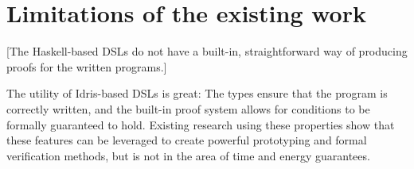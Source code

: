\section{Limitations of the existing work}
	[The Haskell-based DSLs do not have a built-in, straightforward way of producing proofs for the written programs.]
	
	The utility of Idris-based DSLs is great: The types ensure that the program is correctly written, and the built-in proof system allows for conditions to be formally guaranteed to hold. Existing research using these properties \cite{5158855,brady2010correct,10.1007/978-3-642-27694-1_18} show that these features can be leveraged to create powerful prototyping and formal verification methods, but is not in the area of time and energy guarantees.
